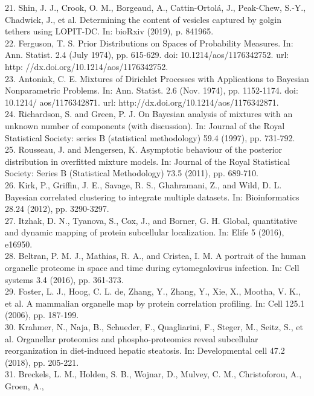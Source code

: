 \documentclass[12pt,english]{article}
\begin{document}
21. Shin, J. J., Crook, O. M., Borgeaud, A., Cattin-Ortolá, J., Peak-Chew, S.-Y., Chadwick,
J., et al. Determining the content of vesicles captured by golgin tethers using LOPIT-DC. In: bioRxiv (2019), p. 841965.
\\
22. Ferguson, T. S. Prior Distributions on Spaces of Probability Measures. In: Ann.
Statist. 2.4 (July 1974), pp. 615-629. doi: 10.1214/aos/1176342752. url: http:
//dx.doi.org/10.1214/aos/1176342752.
\\
23. Antoniak, C. E. Mixtures of Dirichlet Processes with Applications to Bayesian Nonparametric
Problems. In: Ann. Statist. 2.6 (Nov. 1974), pp. 1152-1174. doi: 10.1214/
aos/1176342871. url: http://dx.doi.org/10.1214/aos/1176342871.
\\
24. Richardson, S. and Green, P. J. On Bayesian analysis of mixtures with an unknown
number of components (with discussion). In: Journal of the Royal Statistical Society:
series B (statistical methodology) 59.4 (1997), pp. 731-792.
\\
25. Rousseau, J. and Mengersen, K. Asymptotic behaviour of the posterior distribution
in overfitted mixture models. In: Journal of the Royal Statistical Society: Series B
(Statistical Methodology) 73.5 (2011), pp. 689-710.
\\
26. Kirk, P., Griffin, J. E., Savage, R. S., Ghahramani, Z., and Wild, D. L. Bayesian
correlated clustering to integrate multiple datasets. In: Bioinformatics 28.24 (2012),
pp. 3290-3297.
\\
27. Itzhak, D. N., Tyanova, S., Cox, J., and Borner, G. H. Global, quantitative and dynamic
mapping of protein subcellular localization. In: Elife 5 (2016), e16950.
\\
28. Beltran, P. M. J., Mathias, R. A., and Cristea, I. M. A portrait of the human organelle
proteome in space and time during cytomegalovirus infection. In: Cell systems 3.4
(2016), pp. 361-373.
\\
29. Foster, L. J., Hoog, C. L. de, Zhang, Y., Zhang, Y., Xie, X., Mootha, V. K., et al.
A mammalian organelle map by protein correlation profiling. In: Cell 125.1 (2006),
pp. 187-199.
\\
30. Krahmer, N., Naja, B., Schueder, F., Quagliarini, F., Steger, M., Seitz, S., et al.
Organellar proteomics and phospho-proteomics reveal subcellular reorganization in
diet-induced hepatic steatosis. In: Developmental cell 47.2 (2018), pp. 205-221.
\\
31. Breckels, L. M., Holden, S. B., Wojnar, D., Mulvey, C. M., Christoforou, A., Groen, A.,
\end{document}
